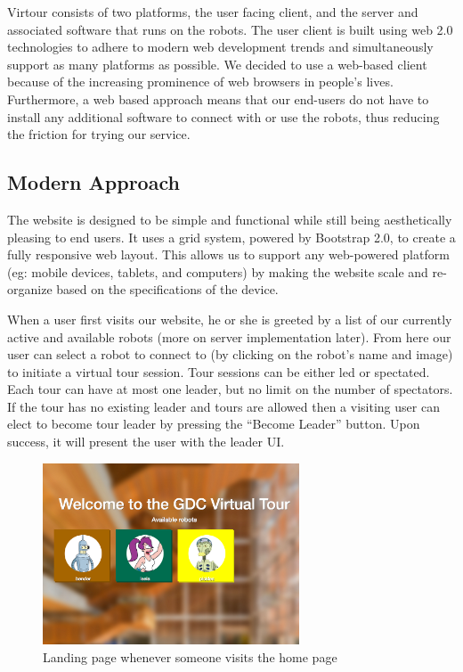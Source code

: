 \documentclass{sig-alternate-05-2015}
\begin{document}
Virtour consists of two platforms, the user facing client, and the server
and associated software that runs on the robots. The user client is built using
web 2.0 technologies to adhere to modern web development trends and
simultaneously support as many platforms as possible. We decided to use a
web-based client because of the increasing prominence of web browsers in
people's lives. Furthermore, a web based approach means that our end-users do
not have to install any additional software to connect with or use the robots,
thus reducing the friction for trying our service.

\subsection{Modern Approach}

The website is designed to be simple and functional while still being
aesthetically pleasing to end users. It uses a grid system, powered by
Bootstrap 2.0, to create a fully responsive web layout. This allows us to
support any web-powered platform (eg: mobile devices, tablets, and computers)
by making the website scale and re-organize based on the specifications of the
device.

When a user first visits our website, he or she is greeted by a list of our
currently active and available robots (more on server implementation later).
From here our user can select a robot to connect to (by clicking on the robot's
name and image) to initiate a virtual tour session. Tour sessions can be either
led or spectated. Each tour can have at most one leader, but no limit on the
number of spectators. If the tour has no existing leader and tours are allowed
then a visiting user can elect to become tour leader by pressing the ``Become
Leader'' button. Upon success, it will present the user with the leader UI.

\begin{figure}
\centering
\includegraphics[width=3in]{tour_homepage}
\caption{Landing page whenever someone visits the home page}
\end{figure}
\end{document}
